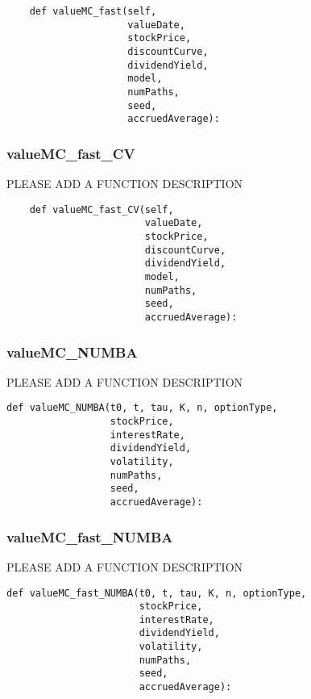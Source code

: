 \documentclass[twoside,11pt]{book}
\begin{document}
\begin{lstlisting}
    def valueMC_fast(self,
                     valueDate,
                     stockPrice,
                     discountCurve,
                     dividendYield,
                     model,
                     numPaths,
                     seed,
                     accruedAverage):
\end{lstlisting}

\subsubsection*{{\bf valueMC\_fast\_CV}}
PLEASE ADD A FUNCTION DESCRIPTION

\begin{lstlisting}
    def valueMC_fast_CV(self,
                        valueDate,
                        stockPrice,
                        discountCurve,
                        dividendYield,
                        model,
                        numPaths,
                        seed,
                        accruedAverage):
\end{lstlisting}

\subsubsection*{{\bf valueMC\_NUMBA}}
PLEASE ADD A FUNCTION DESCRIPTION

\begin{lstlisting}
def valueMC_NUMBA(t0, t, tau, K, n, optionType,
                  stockPrice,
                  interestRate,
                  dividendYield,
                  volatility,
                  numPaths,
                  seed,
                  accruedAverage):
\end{lstlisting}

\subsubsection*{{\bf valueMC\_fast\_NUMBA}}
PLEASE ADD A FUNCTION DESCRIPTION

\begin{lstlisting}
def valueMC_fast_NUMBA(t0, t, tau, K, n, optionType,
                       stockPrice,
                       interestRate,
                       dividendYield,
                       volatility,
                       numPaths,
                       seed,
                       accruedAverage):
\end{lstlisting}
\end{document}
